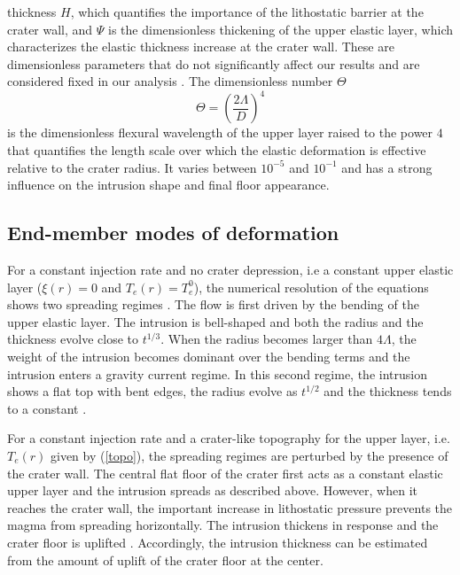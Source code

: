 thickness  $H$, which  quantifies  the importance  of the  lithostatic
barrier at the crater wall, and $\Psi$ is the dimensionless thickening
of the upper elastic layer,  which characterizes the elastic thickness
increase at the crater wall.   These are dimensionless parameters that
do not  significantly affect our  results and are considered  fixed in
our analysis \citep{Thorey:2014cv}.  The dimensionless number $\Theta$
\begin{equation}
  \Theta=\left ( \frac{2\Lambda}{D} \right )^{4}\label{n5}
\end{equation}
is the dimensionless flexural wavelength  of the upper layer raised to
the power $4$ that quantifies the  length scale over which the elastic
deformation  is effective  relative to  the crater  radius. It  varies
between  $10^{-5}$ and  $10^{-1}$ and  has a  strong influence  on the
intrusion shape and final floor appearance.

\subsection{End-member modes of deformation}
\label{sec:end-member-modes-1}

For a constant injection rate and no crater depression, i.e a constant
upper  elastic  layer ($\xi(r)  =  0  $  and  $T_e(r) =  T_e^0$),  the
numerical  resolution of  the  equations shows  two spreading  regimes
\citep{Michaut:2011kg,Michaut:2013dr}.   The flow  is first  driven by
the bending of the upper  elastic layer.  The intrusion is bell-shaped
and both the radius and the  thickness evolve close to $t^{1/3}$. When
the radius becomes larger than $4\Lambda$, the weight of the intrusion
becomes dominant  over the  bending terms and  the intrusion  enters a
gravity current regime.  In this  second regime, the intrusion shows a
flat  top with  bent edges,  the radius  evolve as  $t^{1/2}$ and  the
thickness tends to a constant \citep{Huppert:1982a,Michaut:2011kg}.
 
For a  constant injection  rate and a  crater-like topography  for the
upper  layer,  i.e.  $T_e(r)$  given  by  (\ref{topo}), the  spreading
regimes are perturbed by the presence of the crater wall.  The central
flat floor of the crater first  acts as a constant elastic upper layer
and the intrusion spreads as described above. However, when it reaches
the  crater  wall,  the  important increase  in  lithostatic  pressure
prevents  the  magma  from   spreading  horizontally.   The  intrusion
thickens   in   response   and    the   crater   floor   is   uplifted
\citep{Thorey:2014cv}.   Accordingly, the  intrusion thickness  can be
estimated from the amount of uplift of the crater floor at the center.

